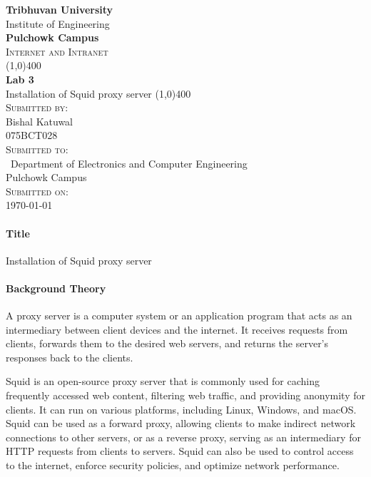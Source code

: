 \documentclass[12pt]{article}
\begin{document}
\begin{titlepage}
    \begin{center}
        \huge{\bfseries  Tribhuvan University}\\
        \Large{Institute of Engineering}\\
        \huge{ \bfseries  Pulchowk Campus}\\[3.2cm]


        \textsc{\Large Internet and Intranet}\\[-0.5cm]
        \line(1,0){400}\\
        \huge{\bfseries Lab 3}\\
        \large{Installation of Squid proxy server}
        \line(1,0){400}\\


        \textsc{\Large Submitted by:}\\
        \Large Bishal Katuwal\\ \large 075BCT028\\    [0.85cm]

        \textsc{\Large Submitted to:}\\\
        \large Department of Electronics and Computer Engineering\\Pulchowk Campus\\    [0.85cm]
        
        \textsc{\Large Submitted on:}\\
        \today
        
    \end{center}
\end{titlepage}
\pagebreak
\paragraph{\Large Title\\}
Installation of Squid proxy server

\paragraph{Background Theory\\}
A proxy server is a computer system or an application program that acts as an intermediary between client devices and the internet. It receives requests from clients, forwards them to the desired web servers, and returns the server's responses back to the clients.

Squid is an open-source proxy server that is commonly used for caching frequently accessed web content, filtering web traffic, and providing anonymity for clients. It can run on various platforms, including Linux, Windows, and macOS. Squid can be used as a forward proxy, allowing clients to make indirect network connections to other servers, or as a reverse proxy, serving as an intermediary for HTTP requests from clients to servers. Squid can also be used to control access to the internet, enforce security policies, and optimize network performance.
\end{document}
